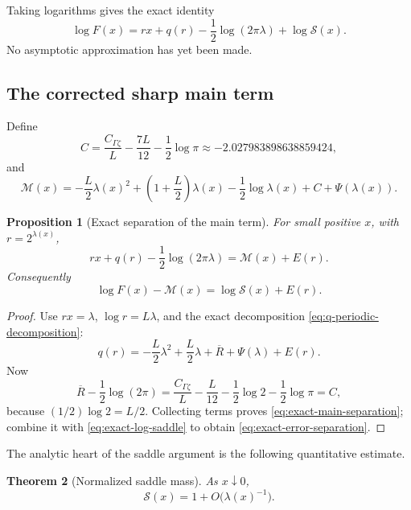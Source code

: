 \documentclass[11pt,oneside]{article}
\newtheorem{theorem}{Theorem}[section]
\newtheorem{proposition}[theorem]{Proposition}
\theoremstyle{definition}
\theoremstyle{remark}
\newcommand{\Lam}{\lambda}
\newcommand{\Ltwo}{L}
\newcommand{\PsiPer}{\Psi}
\begin{document}
Taking logarithms gives the exact identity
\begin{equation}\label{eq:exact-log-saddle}
 \log F(x)=r x+q(r)-\frac12\log(2\pi\Lam)+\log\mathcal S(x).
\end{equation}
No asymptotic approximation has yet been made.

\subsection{The corrected sharp main term}

Define
\begin{equation}\label{eq:Csharp-def}
 C=\frac{C_{\Gamma\zeta}}{\Ltwo}
   -\frac{7\Ltwo}{12}-\frac12\log\pi
 \approx-2.027983898638859424,
\end{equation}
and
\begin{equation}\label{eq:sharp-main}
 \mathcal M(x)=
 -\frac{\Ltwo}{2}\Lam(x)^2
 +\left(1+\frac{\Ltwo}{2}\right)\Lam(x)
 -\frac12\log\Lam(x)
 +C+\PsiPer(\Lam(x)).
\end{equation}

\begin{proposition}[Exact separation of the main term]\label{prop:exact-main-separation}
For small positive $x$, with $r=2^{\Lam(x)}$,
\begin{equation}\label{eq:exact-main-separation}
  r x+q(r)-\frac12\log(2\pi\Lam)
  =\mathcal M(x)+E(r).
\end{equation}
Consequently
\begin{equation}\label{eq:exact-error-separation}
  \log F(x)-\mathcal M(x)=\log\mathcal S(x)+E(r).
\end{equation}
\end{proposition}

\begin{proof}
Use $rx=\Lam$, $\log r=\Ltwo\Lam$, and the exact decomposition
\eqref{eq:q-periodic-decomposition}:
\[
 q(r)=-\frac{\Ltwo}{2}\Lam^2+\frac{\Ltwo}{2}\Lam
 +\overline R+\PsiPer(\Lam)+E(r).
\]
Now
\[
 \overline R-\frac12\log(2\pi)
 =\frac{C_{\Gamma\zeta}}{\Ltwo}-\frac{\Ltwo}{12}
  -\frac12\log2-\frac12\log\pi=C,
\]
because $(1/2)\log2=\Ltwo/2$.  Collecting terms proves
\eqref{eq:exact-main-separation}; combine it with
\eqref{eq:exact-log-saddle} to obtain \eqref{eq:exact-error-separation}.
\end{proof}

The analytic heart of the saddle argument is the following quantitative estimate.

\begin{theorem}[Normalized saddle mass]\label{thm:saddle-mass-leading}
As $x\downarrow0$,
\begin{equation}\label{eq:saddle-mass-leading}
  \mathcal S(x)=1+O\bigl(\Lam(x)^{-1}\bigr).
\end{equation}
\end{theorem}
\end{document}

